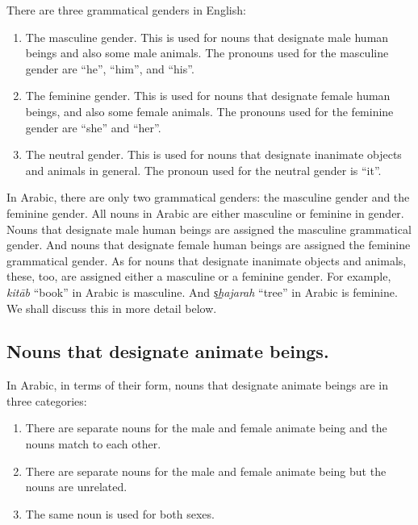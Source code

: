 \documentclass[
  10pt,
]{book}
\providecommand{\tightlist}{%
  \setlength{\itemsep}{0pt}\setlength{\parskip}{0pt}}
\renewcommand{\foreignlanguage}[2]{\oldforeignlanguage{#1}{\smash{#2}}}
\begin{document}
There are three grammatical genders in English:

\begin{enumerate}
\def\labelenumi{\arabic{enumi}.}
\tightlist
\item
  The masculine gender. This is used for nouns that designate male human beings and also some male animals. The pronouns used for the masculine gender are \enquote{he}, \enquote{him}, and \enquote{his}.
\item
  The feminine gender. This is used for nouns that designate female human beings, and also some female animals. The pronouns used for the feminine gender are \enquote{she} and \enquote{her}.
\item
  The neutral gender. This is used for nouns that designate inanimate objects and animals in general. The pronoun used for the neutral gender is \enquote{it}.
\end{enumerate}

In Arabic, there are only two grammatical genders: the masculine gender and the feminine gender.
All nouns in Arabic are either masculine or feminine in gender.
Nouns that designate male human beings are assigned the masculine grammatical gender. And
nouns that designate female human beings are assigned the feminine grammatical gender.
As for nouns that designate inanimate objects and animals, these, too, are assigned either a masculine or a feminine gender. For example, \foreignlanguage{arabic}{کِتَاب} \emph{kitāb} \enquote{book} in Arabic is masculine. And \foreignlanguage{arabic}{شَجَرَة} \emph{s͟hajarah} \enquote{tree} in Arabic is feminine.
We shall discuss this in more detail below.

\subsection{Nouns that designate animate beings.}\label{nouns-that-designate-animate-beings.}

In Arabic, in terms of their form, nouns that designate animate beings are in three categories:

\begin{enumerate}
\def\labelenumi{\arabic{enumi}.}
\tightlist
\item
  There are separate nouns for the male and female animate being and the nouns match to each other.
\item
  There are separate nouns for the male and female animate being but the nouns are unrelated.
\item
  The same noun is used for both sexes.
\end{enumerate}
\end{document}
